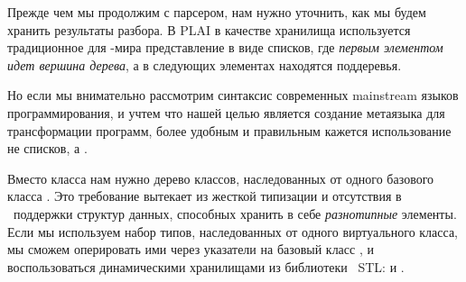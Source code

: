 \secdown

Прежде чем мы продолжим с парсером, нам нужно уточнить, как мы будем хранить
результаты разбора. В PLAI в качестве хранилища  используется традиционное для \lisp-мира представление в виде списков,
где \emph{первым элементом идет вершина дерева}, а в следующих элементах
находятся поддеревья.

Но если мы внимательно рассмотрим синтаксис современных main\-stream языков
программирования, и учтем что нашей целью
является создание метаязыка для трансформации программ, более удобным и
правильным кажется использование не списков, а .

Вместо класса  нам нужно дерево классов, наследованных от одного
 базового класса . Это требование вытекает из
жесткой типизации и отсутствия в \cpp\ поддержки  структур
данных, способных хранить в себе \emph{разнотипные} элементы. Если мы используем
набор типов,
наследованных от одного виртуального класса, мы сможем оперировать ими через
указатели на базовый класс , и воспользоваться динамическими
хранилищами из библиотеки \cpp\ STL:  и
.


